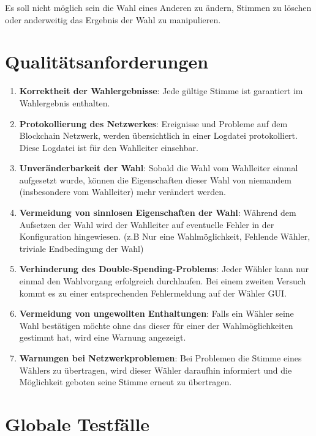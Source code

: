 \documentclass[parskip=full,11pt,twoside]{scrartcl}
\begin{document}
Es soll nicht möglich sein die Wahl eines Anderen zu ändern, Stimmen zu löschen oder anderweitig das Ergebnis der Wahl zu manipulieren.

\section{Qualitätsanforderungen}
\begin{enumerate}
	\item \textbf{Korrektheit der Wahlergebnisse}: Jede gültige Stimme ist garantiert im Wahlergebnis enthalten.
	\item \textbf{Protokollierung des Netzwerkes}: Ereignisse und Probleme auf dem Blockchain Netzwerk, werden übersichtlich in einer Logdatei protokolliert. Diese Logdatei ist für den Wahlleiter einsehbar.
	\item \textbf{Unveränderbarkeit der Wahl}: Sobald die Wahl vom Wahlleiter einmal aufgesetzt wurde, können die Eigenschaften dieser Wahl von niemandem (insbesondere vom Wahlleiter) mehr verändert werden.
	\item \textbf{Vermeidung von sinnlosen Eigenschaften der Wahl}: Während dem Aufsetzen der Wahl wird der Wahlleiter auf eventuelle Fehler in der Konfiguration hingewiesen. (z.B Nur eine Wahlmöglichkeit, Fehlende Wähler, triviale Endbedingung der Wahl)
	\item \textbf{Verhinderung des Double-Spending-Problems}: Jeder Wähler kann nur einmal den Wahlvorgang erfolgreich durchlaufen. Bei einem zweiten Versuch kommt es zu einer entsprechenden Fehlermeldung auf der Wähler GUI.
	\item \textbf{Vermeidung von ungewollten Enthaltungen}: Falls ein Wähler seine Wahl bestätigen möchte ohne das dieser für einer der Wahlmöglichkeiten gestimmt hat, wird eine Warnung angezeigt.
	\item \textbf{Warnungen bei Netzwerkproblemen}: Bei Problemen die Stimme eines Wählers zu übertragen, wird dieser Wähler daraufhin informiert und die Möglichkeit geboten seine Stimme erneut zu übertragen. 
\end{enumerate}

\section{Globale Testfälle}
\end{document}
